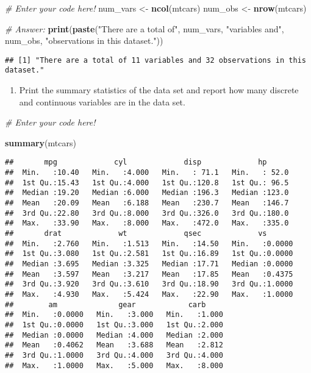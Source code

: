 \documentclass[
]{article}
\newenvironment{Shaded}{\begin{snugshade}}{\end{snugshade}}
\newcommand{\CommentTok}[1]{\textcolor[rgb]{0.56,0.35,0.01}{\textit{#1}}}
\newcommand{\FunctionTok}[1]{\textcolor[rgb]{0.13,0.29,0.53}{\textbf{#1}}}
\newcommand{\NormalTok}[1]{#1}
\newcommand{\OtherTok}[1]{\textcolor[rgb]{0.56,0.35,0.01}{#1}}
\newcommand{\StringTok}[1]{\textcolor[rgb]{0.31,0.60,0.02}{#1}}
\providecommand{\tightlist}{%
  \setlength{\itemsep}{0pt}\setlength{\parskip}{0pt}}
\begin{document}
\begin{Shaded}
\begin{Highlighting}[]
\CommentTok{\# Enter your code here!}
\NormalTok{num\_vars }\OtherTok{\textless{}{-}} \FunctionTok{ncol}\NormalTok{(mtcars)}
\NormalTok{num\_obs }\OtherTok{\textless{}{-}} \FunctionTok{nrow}\NormalTok{(mtcars)}

\CommentTok{\# Answer:}
\FunctionTok{print}\NormalTok{(}\FunctionTok{paste}\NormalTok{(}\StringTok{"There are a total of"}\NormalTok{, num\_vars, }\StringTok{"variables and"}\NormalTok{, num\_obs, }\StringTok{"observations in this dataset."}\NormalTok{))}
\end{Highlighting}
\end{Shaded}

\begin{verbatim}
## [1] "There are a total of 11 variables and 32 observations in this dataset."
\end{verbatim}

\begin{enumerate}
\def\labelenumi{\alph{enumi}.}
\setcounter{enumi}{1}
\tightlist
\item
  Print the summary statistics of the data set and report how many
  discrete and continuous variables are in the data set.
\end{enumerate}

\begin{Shaded}
\begin{Highlighting}[]
\CommentTok{\# Enter your code here!}

\FunctionTok{summary}\NormalTok{(mtcars)}
\end{Highlighting}
\end{Shaded}

\begin{verbatim}
##       mpg             cyl             disp             hp       
##  Min.   :10.40   Min.   :4.000   Min.   : 71.1   Min.   : 52.0  
##  1st Qu.:15.43   1st Qu.:4.000   1st Qu.:120.8   1st Qu.: 96.5  
##  Median :19.20   Median :6.000   Median :196.3   Median :123.0  
##  Mean   :20.09   Mean   :6.188   Mean   :230.7   Mean   :146.7  
##  3rd Qu.:22.80   3rd Qu.:8.000   3rd Qu.:326.0   3rd Qu.:180.0  
##  Max.   :33.90   Max.   :8.000   Max.   :472.0   Max.   :335.0  
##       drat             wt             qsec             vs        
##  Min.   :2.760   Min.   :1.513   Min.   :14.50   Min.   :0.0000  
##  1st Qu.:3.080   1st Qu.:2.581   1st Qu.:16.89   1st Qu.:0.0000  
##  Median :3.695   Median :3.325   Median :17.71   Median :0.0000  
##  Mean   :3.597   Mean   :3.217   Mean   :17.85   Mean   :0.4375  
##  3rd Qu.:3.920   3rd Qu.:3.610   3rd Qu.:18.90   3rd Qu.:1.0000  
##  Max.   :4.930   Max.   :5.424   Max.   :22.90   Max.   :1.0000  
##        am              gear            carb      
##  Min.   :0.0000   Min.   :3.000   Min.   :1.000  
##  1st Qu.:0.0000   1st Qu.:3.000   1st Qu.:2.000  
##  Median :0.0000   Median :4.000   Median :2.000  
##  Mean   :0.4062   Mean   :3.688   Mean   :2.812  
##  3rd Qu.:1.0000   3rd Qu.:4.000   3rd Qu.:4.000  
##  Max.   :1.0000   Max.   :5.000   Max.   :8.000
\end{verbatim}
\end{document}
